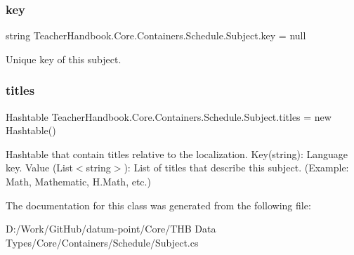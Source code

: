 \subsubsection{\texorpdfstring{key}{key}}
{\footnotesize\ttfamily string Teacher\+Handbook.\+Core.\+Containers.\+Schedule.\+Subject.\+key = null}



Unique key of this subject. 

\mbox{\label{class_teacher_handbook_1_1_core_1_1_containers_1_1_schedule_1_1_subject_ac024684f42182cdbcf4ae477395f92a1}} 
\subsubsection{\texorpdfstring{titles}{titles}}
{\footnotesize\ttfamily Hashtable Teacher\+Handbook.\+Core.\+Containers.\+Schedule.\+Subject.\+titles = new Hashtable()}



Hashtable that contain titles relative to the localization. Key(string)\+: Language key. Value (List$<$string$>$)\+: List of titles that describe this subject. (Example\+: Math, Mathematic, H.\+Math, etc.) 



The documentation for this class was generated from the following file\+:\begin{DoxyCompactItemize}
\item 
D\+:/\+Work/\+Git\+Hub/datum-\/point/\+Core/\+T\+H\+B Data Types/\+Core/\+Containers/\+Schedule/Subject.\+cs\end{DoxyCompactItemize}
